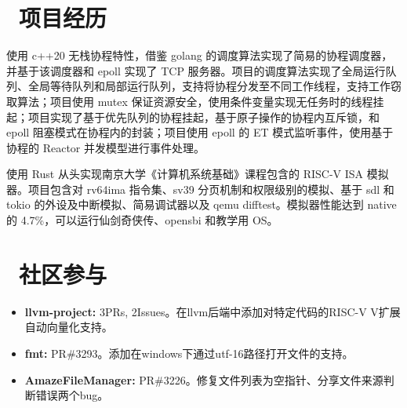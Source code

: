 \documentclass{resume}
\begin{document}
\section{\faCogs\ 项目经历}

\begin{onehalfspacing}
  使用 c++20 无栈协程特性，借鉴 golang 的调度算法实现了简易的协程调度器，并基于该调度器和 epoll 实现了 TCP 服务器。项目的调度算法实现了全局运行队列、全局等待队列和局部运行队列，支持将协程分发至不同工作线程，支持工作窃取算法；项目使用 mutex 保证资源安全，使用条件变量实现无任务时的线程挂起；项目实现了基于优先队列的协程挂起，基于原子操作的协程内互斥锁，和epoll 阻塞模式在协程内的封装；项目使用 epoll 的 ET 模式监听事件，使用基于协程的 Reactor 并发模型进行事件处理。
\end{onehalfspacing}

\begin{onehalfspacing}
  使用 Rust 从头实现南京大学《计算机系统基础》课程包含的 RISC-V ISA 模拟器。项目包含对 rv64ima 指令集、sv39 分页机制和权限级别的模拟、基于 sdl 和 tokio 的外设及中断模拟、简易调试器以及 qemu difftest。模拟器性能达到 native 的 4.7\%，可以运行仙剑奇侠传、opensbi 和教学用 OS。

\end{onehalfspacing}



\section{\faGithub\ 社区参与}
\begin{itemize}[parsep=0.5ex]
  \item {\large \textbf{llvm-project:}} 3PRs, 2Issues。在llvm后端中添加对特定代码的RISC-V V扩展自动向量化支持。
  \item {\large \textbf{fmt:}} PR\#3293。添加在windows下通过utf-16路径打开文件的支持。
  \item {\large \textbf{AmazeFileManager:}} PR\#3226。修复文件列表为空指针、分享文件来源判断错误两个bug。
\end{itemize}



% 
\end{document}
